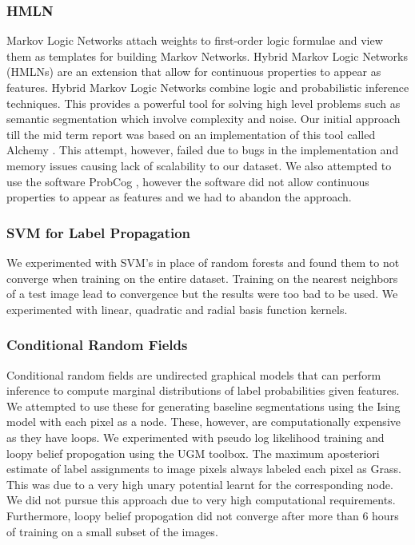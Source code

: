 \documentclass{article} %
\begin{document}
\subsubsection{HMLN}
Markov Logic Networks \cite{Domingos06unifyinglogical} \cite{Richardson06markovlogic} attach weights to first-order logic formulae and view them as templates for building Markov Networks. Hybrid Markov Logic Networks (HMLNs)\cite{wang2008hybrid} are an extension that allow for continuous properties to appear as features. Hybrid Markov Logic Networks combine logic and probabilistic inference techniques. This provides a powerful tool for solving high level problems such as semantic segmentation which involve complexity and noise. Our initial approach till the mid term report was based on an implementation of this tool called Alchemy \cite{alchemy}. This attempt, however, failed due to bugs in the implementation and memory issues causing lack of scalability to our dataset. We also attempted to use the software ProbCog \cite{progcog}, however the software did not allow continuous properties to appear as features and we had to abandon the approach. 

\subsubsection{SVM for Label Propagation}
We experimented with SVM's in place of random forests and found them to not converge when training on the entire dataset. Training on the nearest neighbors of a test image lead to convergence but the results were too bad to be used. We experimented with linear, quadratic and radial basis function kernels.

\subsubsection{Conditional Random Fields}
Conditional random fields \cite{lafferty2001conditional} are undirected graphical models that can perform inference to compute marginal distributions of label probabilities given features.
We attempted to use these for generating baseline segmentations using the Ising model with each pixel as a node.
These, however, are computationally expensive as they have loops.
We experimented with pseudo log likelihood training and loopy belief propogation using the UGM toolbox\cite{UGMSoftware}.
The maximum aposteriori estimate of label assignments to image pixels always labeled each pixel as Grass.
This was due to a very high unary potential learnt for the corresponding node. 
We did not pursue this approach due to very high computational requirements.
Furthermore, loopy belief propogation did not converge after more than 6 hours of training on a small subset of the images.
\end{document}
